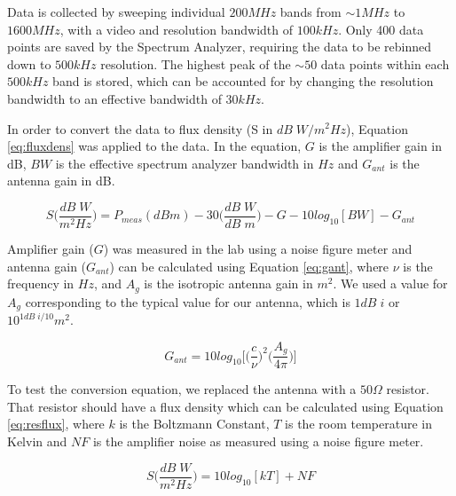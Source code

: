 Data is collected by sweeping individual $200 MHz$ bands from $\sim1 MHz$ to $1600 MHz$, with a video and resolution bandwidth of $100 kHz$. Only 400 data points are saved by the Spectrum Analyzer, requiring the data to be rebinned down to $500 kHz$ resolution. The highest peak of the $\sim50$ data points within each $500 kHz$ band is stored, which can be accounted for by changing the resolution bandwidth to an effective bandwidth of $30 kHz$. 

In order to convert the data to flux density (S in $dB \; W/m^2Hz$), Equation \ref{eq:fluxdens} was applied to the data. In the equation, $G$ is the amplifier gain in dB, $BW$ is the effective spectrum analyzer bandwidth in $Hz$ and $G_{ant}$ is the antenna gain in dB. 

\begin{equation}\label{eq:fluxdens}
S \Bigg( \frac{dB \; W}{m^2 Hz} \Bigg) = P_{meas} (dBm) - 30 \Bigg( \frac{dB \; W}{dB \;m} \Bigg) - G - 10log_{10} [BW] - G_{ant}
\end{equation}

Amplifier gain ($G$) was measured in the lab using a noise figure meter and antenna gain ($G_{ant}$) can be calculated using Equation \ref{eq:gant}, where $\nu$ is the frequency in $Hz$, and $A_g$ is the isotropic antenna gain in $m^2$. We used a value for $A_g$ corresponding to the typical value for our antenna, which is $1 dB \;i$ or $10^{1dB \;i/10} m^2$. 

\begin{equation}\label{eq:gant}
G_{ant}= 10 log_{10} \Bigg[ \Bigg(\frac{c}{\nu} \Bigg)^2 \Bigg( \frac{A_g}{4 \pi} \Bigg) \Bigg]
\end{equation}

To test the conversion equation, we replaced the antenna with a $50 \Omega$ resistor. That resistor should have a flux density which can be calculated using Equation \ref{eq:resflux}, where $k$ is the Boltzmann Constant, $T$ is the room temperature in Kelvin and $NF$ is the amplifier noise as measured using a noise figure meter. 

\begin{equation}\label{eq:resflux}
S \Bigg( \frac{dB \; W}{m^2 Hz} \Bigg) = 10 log_{10} [k T] + NF 
\end{equation}

